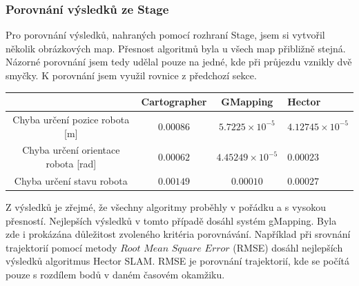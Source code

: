 \documentclass[12pt]{article}
\begin{document}
\subsubsection{Porovnání výsledků ze Stage}
Pro porovnání výsledků, nahraných pomocí rozhraní Stage, jsem si vytvořil několik obrázkových map. Přesnost algoritmů byla u všech map přibližně stejná. Názorné porovnání jsem tedy udělal pouze na jedné, kde při průjezdu vznikly dvě smyčky. K porovnání jsem využil rovnice z předchozí sekce.\\
\begin{center}
	\begin{tabular}{c|ccp{3cm}}
		\bfseries \bfseries  & \bfseries Cartographer & \bfseries GMapping & \bfseries Hector \\[2mm]
		\hline
		Chyba určení pozice robota [m] & $0.00086$ & $5.7225\times10^{-5}$ & $4.12745\times10^{-5}$ \\
		Chyba určení orientace robota [rad] & $0.00062$ & $4.45249\times10^{-5}$ & $0.00023$\\
		Chyba určení stavu robota & $0.00149$ & $0.00010$ & $0.00027$ \\
	\end{tabular}
\end{center}

Z výsledků je zřejmé, že všechny algoritmy proběhly v pořádku a s vysokou přesností. Nejlepších výsledků v tomto případě dosáhl systém gMapping. Byla zde i prokázána důležitost zvoleného kritéria porovnávání. Například při srovnání trajektorií pomocí metody $Root$ $Mean$ $Square$ $Error$ (RMSE) dosáhl nejlepších výsledků algoritmus Hector SLAM. RMSE je porovnání trajektorií, kde se počítá pouze s rozdílem bodů v daném časovém okamžiku. 

\newpage
\end{document}
